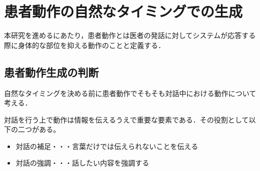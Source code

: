 \section{患者動作の自然なタイミングでの生成}\label{formulation_system}
本研究を進めるにあたり，患者動作とは医者の発話に対してシステムが応答する際に身体的な部位を抑える動作のことと定義する． 

\subsection{患者動作生成の判断}\label{}
自然なタイミングを決める前に患者動作でそもそも対話中における動作について考える．
\par
対話を行う上で動作は情報を伝えるうえで重要な要素である．その役割として以下の二つがある。
 \begin{itemize}
  \item 対話の補足・・・言葉だけでは伝えられないことを伝える
  \item 対話の強調・・・話したい内容を強調する
 \end{itemize}


